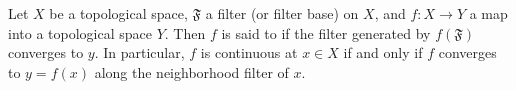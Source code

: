Let $X$ be a topological space, $\mathfrak{F}$ a filter (or filter base) on $X$, and $f: X \rightarrow Y$ a map into a topological space $Y$. Then $f$ is said to  if the filter generated by $f(\mathfrak{F})$ converges to $y$. In particular, $f$ is continuous at $x \in X$ if and only if $f$ converges to $y = f(x)$ along the neighborhood filter of $x$.
